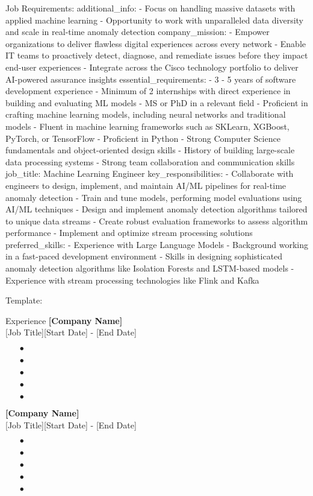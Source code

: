     Job Requirements:
    additional_info:
- Focus on handling massive datasets with applied machine learning
- Opportunity to work with unparalleled data diversity and scale in real-time anomaly
  detection
company_mission:
- Empower organizations to deliver flawless digital experiences across every network
- Enable IT teams to proactively detect, diagnose, and remediate issues before they
  impact end-user experiences
- Integrate across the Cisco technology portfolio to deliver AI-powered assurance
  insights
essential_requirements:
- 3 - 5 years of software development experience
- Minimum of 2 internships with direct experience in building and evaluating ML models
- MS or PhD in a relevant field
- Proficient in crafting machine learning models, including neural networks and traditional
  models
- Fluent in machine learning frameworks such as SKLearn, XGBoost, PyTorch, or TensorFlow
- Proficient in Python
- Strong Computer Science fundamentals and object-oriented design skills
- History of building large-scale data processing systems
- Strong team collaboration and communication skills
job_title: Machine Learning Engineer
key_responsibilities:
- Collaborate with engineers to design, implement, and maintain AI/ML pipelines for
  real-time anomaly detection
- Train and tune models, performing model evaluations using AI/ML techniques
- Design and implement anomaly detection algorithms tailored to unique data streams
- Create robust evaluation frameworks to assess algorithm performance
- Implement and optimize stream processing solutions
preferred_skills:
- Experience with Large Language Models
- Background working in a fast-paced development environment
- Skills in designing sophisticated anomaly detection algorithms like Isolation Forests
  and LSTM-based models
- Experience with stream processing technologies like Flink and Kafka


    Template:
    \begin{rSection}{Experience}
{\bf [Company Name]} \\ 
{[Job Title]}\hfill {[Start Date] - [End Date]}
\begin{itemize}[label=\myfancylabel, leftmargin=0.5cm]
\setlength\itemsep{-0.25cm}
    \item[$\bullet$] 
    \item[$\bullet$] 
    \item[$\bullet$] 
    \item[$\bullet$] 
    \item[$\bullet$] 
\end{itemize}

{\bf [Company Name]} \\ 
{[Job Title]}\hfill {[Start Date] - [End Date]}
\begin{itemize}[label=\myfancylabel, leftmargin=0.5cm]
\setlength\itemsep{-0.25cm}
    \item[$\bullet$] 
    \item[$\bullet$] 
    \item[$\bullet$] 
    \item[$\bullet$] 
    \item[$\bullet$] 
\end{itemize}

\end{rSection}

